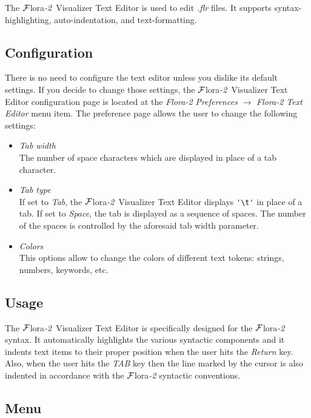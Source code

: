 \documentclass[a4paper,11pt]{article}
\newcommand{\FLORA}{{\mbox{\sc ${\cal F}${lora}\rm\emph{-2}}}\xspace}
\newcommand{\FVIZ}{{\mbox{\sc ${\cal F}${lora}\rm\emph{-2} {Visualizer}}}\xspace}
\begin{document}
The \FVIZ Text Editor is used to edit \emph{.flr} files. It supports
syntax-highlighting, auto-indentation, and text-formatting.

\subsection{Configuration}
\label{sec:texteditor_configuration}

There is no need to configure the text editor unless you dislike its
default settings. If you decide to change those settings,
the \FVIZ Text Editor configuration page is located at the \emph{Flora-2
  Preferences} $\rightarrow$ \emph{Flora-2 Text Editor} menu item.
The preference page allows the user to change the following settings:
\begin{itemize}
\item \emph{Tab width} \\
  The number of space characters which are displayed in place of a tab
  character.

\item  \emph{Tab type} \\
  If set to \emph{Tab}, the \FVIZ Text Editor displays \lstinline|'\t'| in
  place of a tab.  If set to \emph{Space}, the tab is displayed as a
  sequence of spaces. The number of the spaces is controlled by the aforesaid
  tab width parameter.


\item \emph{Colors}\\
  This options allow to change the colors of different text tokens:
  strings, numbers, keywords, etc.
\end{itemize}

\subsection{Usage}
\label{sec:texteditor_usage}

The \FVIZ Text Editor is specifically designed for the \FLORA
syntax. It automatically highlights the various syntactic components
and it indents text items to their proper position when the user hits the
\emph{Return} key.
Also, when the user hits the \emph{TAB} key then the line marked by the
cursor is also indented in accordance with the \FLORA syntactic conventions.

\subsection{Menu}
\label{sec:texteditor_menu}
\end{document}
